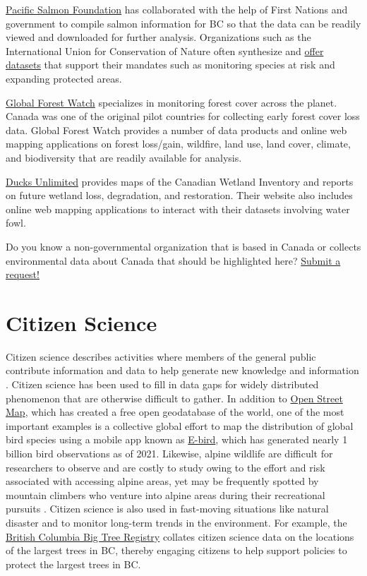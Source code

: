 \documentclass[
]{book}
\begin{document}
\href{https://www.salmonexplorer.ca/\#!/}{Pacific Salmon Foundation} has collaborated with the help of First Nations and government to compile salmon information for BC so that the data can be readily viewed and downloaded for further analysis. Organizations such as the International Union for Conservation of Nature often synthesize and \href{https://www.iucn.org/resources/conservation-tools}{offer datasets} that support their mandates such as monitoring species at risk and expanding protected areas.

\href{https://www.globalforestwatch.org/}{Global Forest Watch} specializes in monitoring forest cover across the planet. Canada was one of the original pilot countries for collecting early forest cover loss data. Global Forest Watch provides a number of data products and online web mapping applications on forest loss/gain, wildfire, land use, land cover, climate, and biodiversity that are readily available for analysis.

\href{https://www.ducks.ca}{Ducks Unlimited} provides maps of the Canadian Wetland Inventory and reports on future wetland loss, degradation, and restoration. Their website also includes online web mapping applications to interact with their datasets involving water fowl.

Do you know a non-governmental organization that is based in Canada or collects environmental data about Canada that should be highlighted here? \href{https://github.com/ubc-geomatics-textbook/geomatics-textbook/issues/new/choose}{Submit a request!}

\section{Citizen Science}\label{citizen-science}

Citizen science describes activities where members of the general public contribute information and data to help generate new knowledge and information \citep{lee_review_2020}. Citizen science has been used to fill in data gaps for widely distributed phenomenon that are otherwise difficult to gather. In addition to \href{https://www.openstreetmap.org/}{Open Street Map}, which has created a free open geodatabase of the world, one of the most important examples is a collective global effort to map the distribution of global bird species using a mobile app known as \href{https://ebird.org/home}{E-bird}, which has generated nearly 1 billion bird observations as of 2021. Likewise, alpine wildlife are difficult for researchers to observe and are costly to study owing to the effort and risk associated with accessing alpine areas, yet may be frequently spotted by mountain climbers who venture into alpine areas during their recreational pursuits \citep{jackson_citizen_2015}. Citizen science is also used in fast-moving situations like natural disaster and to monitor long-term trends in the environment. For example, the \href{https://bigtrees.forestry.ubc.ca/bc-bigtree-registry/}{British Columbia Big Tree Registry} collates citizen science data on the locations of the largest trees in BC, thereby engaging citizens to help support policies to protect the largest trees in BC.
\end{document}
